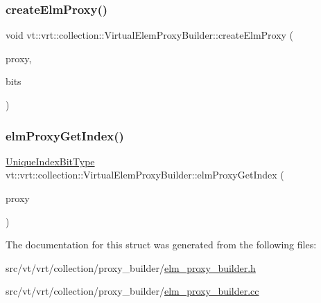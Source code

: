 \subsubsection{\texorpdfstring{create\+Elm\+Proxy()}{createElmProxy()}}
{\footnotesize\ttfamily void vt\+::vrt\+::collection\+::\+Virtual\+Elem\+Proxy\+Builder\+::create\+Elm\+Proxy (\begin{DoxyParamCaption}\item[{\hyperlink{namespacevt_aa68633cd16822ae31c1cf521f817a23e}{Virtual\+Elm\+Only\+Proxy\+Type} \&}]{proxy,  }\item[{\hyperlink{namespacevt_a913e1f07b5228dd8bb64040dc6dcea14}{Unique\+Index\+Bit\+Type} const \&}]{bits }\end{DoxyParamCaption})\hspace{0.3cm}{\ttfamily [static]}}

\mbox{\label{structvt_1_1vrt_1_1collection_1_1_virtual_elem_proxy_builder_a8143b940105dd88b4c5733a0ce19c923}} 
\subsubsection{\texorpdfstring{elm\+Proxy\+Get\+Index()}{elmProxyGetIndex()}}
{\footnotesize\ttfamily \hyperlink{namespacevt_a913e1f07b5228dd8bb64040dc6dcea14}{Unique\+Index\+Bit\+Type} vt\+::vrt\+::collection\+::\+Virtual\+Elem\+Proxy\+Builder\+::elm\+Proxy\+Get\+Index (\begin{DoxyParamCaption}\item[{\hyperlink{namespacevt_aa68633cd16822ae31c1cf521f817a23e}{Virtual\+Elm\+Only\+Proxy\+Type} const \&}]{proxy }\end{DoxyParamCaption})\hspace{0.3cm}{\ttfamily [static]}}



The documentation for this struct was generated from the following files\+:\begin{DoxyCompactItemize}
\item 
src/vt/vrt/collection/proxy\+\_\+builder/\hyperlink{elm__proxy__builder_8h}{elm\+\_\+proxy\+\_\+builder.\+h}\item 
src/vt/vrt/collection/proxy\+\_\+builder/\hyperlink{elm__proxy__builder_8cc}{elm\+\_\+proxy\+\_\+builder.\+cc}\end{DoxyCompactItemize}
